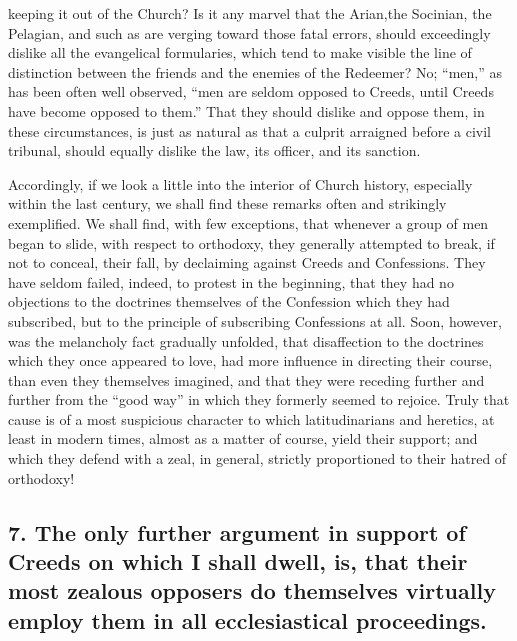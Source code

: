 \documentclass[
]{book}
\begin{document}
keeping it out of the Church? Is it any marvel that the Arian,the Socinian, the Pelagian, and such as are verging toward those fatal errors, should exceedingly dislike all the evangelical formularies, which tend to make visible the line of distinction between the friends and the enemies of the Redeemer? No; ``men,'' as has been often well observed, ``men are seldom opposed to Creeds, until Creeds have become opposed to them.'' That they should dislike and oppose them, in these circumstances, is just as natural as that a culprit arraigned before a civil tribunal, should equally dislike the law, its officer, and its sanction.

Accordingly, if we look a little into the interior of Church history, especially within the last century, we shall find these remarks often and strikingly exemplified. We shall find, with few exceptions, that whenever a group of men began to slide, with respect to orthodoxy, they generally attempted to break, if not to conceal, their fall, by declaiming against Creeds and Confessions. They have seldom failed, indeed, to protest in the beginning, that they had no objections to the doctrines themselves of the Confession which they had subscribed, but to the principle of subscribing Confessions at all. Soon, however, was the melancholy fact gradually unfolded, that disaffection to the doctrines which they once appeared to love, had more influence in directing their course, than even they themselves imagined, and that they were receding further and further from the ``good way'' in which they formerly seemed to rejoice. Truly that cause is of a most suspicious character to which latitudinarians and heretics, at least in modern times, almost as a matter of course, yield their support; and which they defend with a zeal, in general, strictly proportioned to their hatred of orthodoxy!

\hypertarget{the-only-further-argument-in-support-of-creeds-on-which-i-shall-dwell-is-that-their-most-zealous-opposers-do-themselves-virtually-employ-them-in-all-ecclesiastical-proceedings.}{%
\subsection{7. The only further argument in support of Creeds on which I shall dwell, is, that their most zealous opposers do themselves virtually employ them in all ecclesiastical proceedings.}\label{the-only-further-argument-in-support-of-creeds-on-which-i-shall-dwell-is-that-their-most-zealous-opposers-do-themselves-virtually-employ-them-in-all-ecclesiastical-proceedings.}}
\end{document}
